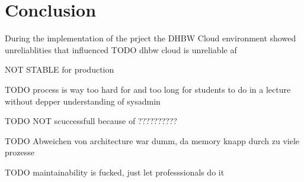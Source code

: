 \section{Conclusion}



During the implementation of the prject the \ac{DHBW} Cloud environment showed unreliablities that influenced
TODO dhbw cloud is unreliable af

NOT STABLE for production

TODO process is way too hard for and too long for students to do in a lecture without depper understanding of sysadmin  

TODO NOT scuccessfull because of ??????????

TODO Abweichen von architecture war dumm, da memory knapp durch zu viele prozesse

TODO maintainability is fucked, just let professsionals do it










